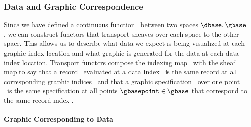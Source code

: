 \documentclass[review]{vgtc}
\theoremstyle{definition}
\theoremstyle{remark}
\begin{document}
\subsubsection{Data and Graphic Correspondence}
Since we have defined a continuous function \vindex\ between two spaces $\dbase, \gbase$, we can construct functors that transport sheaves over each space to the other space\cite{harder2008lectures}. This allows us to describe what data we expect is being visualized at each graphic index location and what graphic is generated for the data at each data index location. Transport functors compose the indexing map \vindex\ with the sheaf map to say that a record \dsection\ evaluated at a data index \dbasepoint\ is the same record at all corresponding  graphic indices \gbasepoint\ and that a graphic specification \gsection\ over one point \gbasepoint\ is the same specification at all points $\gbasepoint \in \gbase$ that correspond to the same record index \dbasepoint.

\paragraph{\textbf{Graphic Corresponding to Data}}
\end{document}
